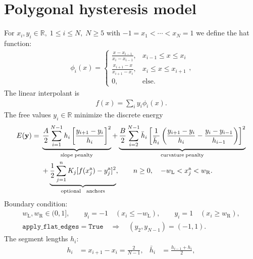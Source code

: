 \documentclass[a4paper,11pt]{article}
\begin{document}
\section*{Polygonal hysteresis model}

For $x_i,y_i\in\mathbb{R}, \; 1 \le i\le N, \; N\ge 5$ with \(-1=x_1<\cdots<x_N=1\)
we define the hat function:
\begin{align}
\phi_i(x) = 
\begin{cases}
\frac{x-x_{i-1}}{x_{i}-x_{i-1}}, & x_{i-1} \le x \le x_{i}
\\
\frac{x_{i+1}-x}{x_{i+1}-x_{i}}, & x_{i} \le x \le x_{i+1}
\\
0 , & \mathrm{else.}
\end{cases},
\end{align}
The linear interpolant is
\begin{align}
f(x) = \sum_{i} y_i \phi_i(x).
\end{align}
%
The free values \(y_i\in\mathbb{R}\) minimize the discrete energy
\begin{align*}
  E(\mathbf{y}) ={}& 
         \underbrace{\frac{A}{2}\sum_{i=1}^{N-1} h_i \left[\frac{y_{i+1}-y_i}{h_i}\right]^2}_{\text{slope\;penalty}} 
       + \underbrace{\frac{B}{2}\sum_{i=2}^{N-1} \bar h_i \left[\frac{1}{\bar h_i}\left(\frac{y_{i+1}-y_i}{h_i}-\frac{y_{i}-y_{i-1}}{h_{i-1}}\right)\right]^2}_{\text{curvature\;penalty}}\\
       &+ \underbrace{\frac{1}{2}\sum_{j=1}^{n} K_j[f(x_j^{\mathrm a})-y_j^{\mathrm a}]^2}_{\text{optional \; anchors}},
       \qquad n\geq 0,\quad -w_{\mathrm L}<x_j^{\mathrm a}<w_{\mathrm R}.
\end{align*}
Boundary condition:
\begin{gather*}
  w_{\mathrm L},w_{\mathrm R}\in(0,1],\qquad
  y_i=-1\quad(x_i\leq -w_{\mathrm L}),\qquad
  y_i=1\quad(x_i\geq w_{\mathrm R}),\\
  \texttt{apply\_flat\_edges}=\texttt{True}
  \quad\Longrightarrow\quad (y_2,y_{N-1})=(-1,1).
\end{gather*}
The segment lengths \(h_i\):
\begin{align*}
  h_i &= x_{i+1}-x_i=\frac{2}{N-1}, &
  \bar h_i &= \frac{h_{i-1}+h_i}{2},  
\end{align*}
\end{document}
